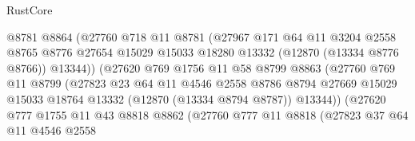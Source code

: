 \begin{lexlean}{RustCore}
\begin{coremodule}
                              @8781
                              @8864
                              (@27760
                                @718
                                @11
                                @8781
                                (@27967
                                  @171
                                  @64
                                  @11
                                  @3204
                                  @2558
                                  @8765
                                  @8776
                                  @27654
                                  @15029
                                  @15033
                                  @18280
                                  @13332
                                  (@12870 (@13334 @8776 @8766))
                                  @13344))
                              (@27620
                                @769
                                @1756
                                @11
                                @58
                                @8799
                                @8863
                                (@27760
                                  @769
                                  @11
                                  @8799
                                  (@27823
                                    @23
                                    @64
                                    @11
                                    @4546
                                    @2558
                                    @8786
                                    @8794
                                    @27669
                                    @15029
                                    @15033
                                    @18764
                                    @13332
                                    (@12870 (@13334 @8794 @8787))
                                    @13344))
                                (@27620
                                  @777
                                  @1755
                                  @11
                                  @43
                                  @8818
                                  @8862
                                  (@27760
                                    @777
                                    @11
                                    @8818
                                    (@27823
                                      @37
                                      @64
                                      @11
                                      @4546
                                      @2558

\end{coremodule}
\end{lexlean}

